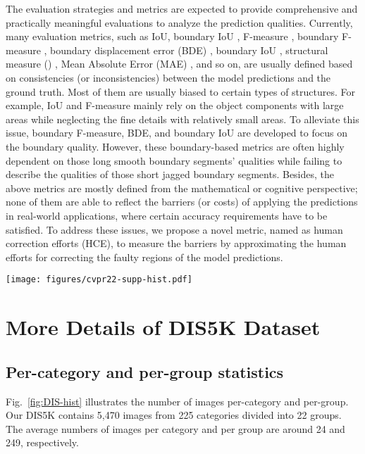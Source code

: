 \documentclass[10pt,twocolumn,letterpaper]{article}
\begin{document}
The evaluation strategies and metrics are expected to provide comprehensive and practically meaningful evaluations to analyze the prediction qualities. 
Currently, many evaluation metrics, such as IoU, boundary IoU \cite{DBLP:conf/cvpr/ChengGDBK21}, F-measure \cite{achanta2009frequency}, boundary F-measure \cite{ehrig2005relaxed, qin2019basnet}, boundary displacement error (BDE) \cite{DBLP:conf/eccv/FreixenetMRMC02}, boundary IoU \cite{DBLP:conf/cvpr/ChengGDBK21}, structural measure () \cite{fan2017structure}, Mean Absolute Error (MAE) \cite{perazzi2012saliency}, and so on, are usually defined based on consistencies (or inconsistencies) between the model predictions and the ground truth. 
Most of them are usually biased to certain types of structures. 
For example, IoU and F-measure mainly rely on the object components with large areas while neglecting the fine details with relatively small areas. 
To alleviate this issue, boundary F-measure, BDE, and boundary IoU are developed to focus on the boundary quality. 
However, these boundary-based metrics are often highly dependent on those long smooth boundary segments' qualities while failing to describe the qualities of those short jagged boundary segments. 
Besides, the above metrics are mostly defined from the mathematical or cognitive perspective; none of them are able to reflect the barriers (or costs) of applying the predictions in real-world applications, where certain accuracy requirements have to be satisfied. 
To address these issues, we propose a novel metric, named as human correction efforts (HCE), to measure the barriers by approximating the human efforts for correcting the faulty regions of the model predictions. 

\begin{figure*}[thbp]
    \centering
    \texttt{[image: figures/cvpr22-supp-hist.pdf]}
\caption{\small Number of images per-category and per-group.}
    \label{fig:DIS-hist}
\end{figure*}

\section{More Details of DIS5K Dataset}
\subsection{Per-category and per-group statistics}
Fig.~\ref{fig:DIS-hist} illustrates the number of images per-category and per-group. Our DIS5K contains 5,470 images from 225 categories divided into 22 groups. The average numbers of images per category and per group are around 24 and 249, respectively.
\end{document}
